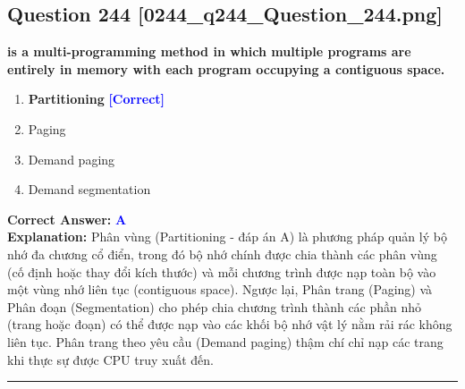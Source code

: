 \documentclass[11pt,a4paper]{article}
\begin{document}
\begin{minipage}{\textwidth}
\subsection*{Question 244 \quad \footnotesize{[0244\_q244\_Question\_244.png]}}
\noindent \textbf{is a multi-programming method in which multiple programs are entirely in memory with each program occupying a contiguous space.}

\begin{enumerate}[label=\Alph*.]
    \item \textbf{Partitioning} \hfill \textcolor{blue}{\textbf{[Correct]}}
    \item Paging
    \item Demand paging
    \item Demand segmentation
\end{enumerate}

\noindent \textbf{Correct Answer:} \textcolor{blue}{\textbf{A}} \\[2pt]
\noindent \textbf{Explanation:} Phân vùng (Partitioning - đáp án A) là phương pháp quản lý bộ nhớ đa chương cổ điển, trong đó bộ nhớ chính được chia thành các phân vùng (cố định hoặc thay đổi kích thước) và mỗi chương trình được nạp toàn bộ vào một vùng nhớ liên tục (contiguous space). Ngược lại, Phân trang (Paging) và Phân đoạn (Segmentation) cho phép chia chương trình thành các phần nhỏ (trang hoặc đoạn) có thể được nạp vào các khối bộ nhớ vật lý nằm rải rác không liên tục. Phân trang theo yêu cầu (Demand paging) thậm chí chỉ nạp các trang khi thực sự được CPU truy xuất đến.

\par\vspace{0.3cm}
\hrule
\vspace{0.3cm}
\end{minipage}
\end{document}
